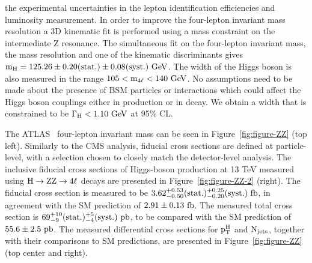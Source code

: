 \documentclass[10pt]{article}
\begin{document}
the experimental uncertainties in the lepton identification efficiencies and
luminosity measurement. In order to improve the four-lepton invariant mass
resolution a 3D kinematic fit is performed using a mass constraint on the
intermediate Z resonance. The simultaneous fit on the four-lepton
invariant mass, the mass resolution and one of the kinematic discriminants
gives ${\rm m_{H} = 125.26 \pm 0.20(stat.) \pm 0.08(syst.)~GeV}$. The width of
the Higgs boson is also measured in the range ${\rm 105 < m_{4\ell} < 140~GeV}$.
No assumptions need to be made about the presence of BSM particles or
interactions which could affect the Higgs boson couplings either in production
or in decay. We obtain a width that is constrained to be
${\rm \Gamma_{H} < 1.10~GeV}$ at 95\% CL.

The ATLAS~\cite{Aaboud:2017oem} four-lepton invariant mass can be seen in
Figure~\ref{fig:figure-ZZ} (top left). Similarly to the CMS analysis, fiducial
cross sections are defined at particle-level, with a selection chosen
to closely match the detector-level analysis. The inclusive fiducial cross
sections of Higgs-boson production at 13 TeV measured using
${\rm H \to ZZ \to 4\ell}$ decays are presented in Figure~\ref{fig:figure-ZZ-2}
(right). The fiducial cross section is measured
to be ${\rm 3.62_{-0.50}^{+0.53}(stat.)_{-0.20}^{+0.25}(syst.)~fb}$, in agreement
with the SM prediction of ${\rm 2.91 \pm 0.13~fb}$. The measured total cross section is
${\rm 69_{-9}^{+10}(stat.)_{-4}^{+5}(syst.)~pb}$, to be compared with the
SM prediction of ${\rm 55.6 \pm 2.5~pb}$. The measured differential cross sections
for ${\rm p_T^{H}}$ and ${\rm N_{jets}}$, together with their comparisons to SM
predictions, are presented in Figure~\ref{fig:figure-ZZ} (top center and right).
\end{document}
